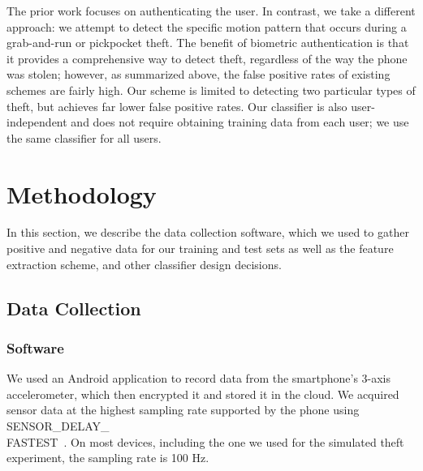 The prior work focuses on authenticating the user.
In contrast, we take a different approach: we attempt to detect the
specific motion pattern that occurs during a grab-and-run or pickpocket theft.
The benefit of biometric authentication is that it provides a comprehensive
way to detect theft, regardless of the way the phone was stolen; however,
as summarized above, the false positive rates of existing schemes
are fairly high.
Our scheme is limited to detecting two particular types of theft, but achieves
far lower false positive rates.
Our classifier is also user-independent and does not require obtaining
training data from each user; we use the same classifier for all users.




\section{Methodology}

In this section, we describe the data collection software, which we used to gather positive and negative data for our training and test sets as well as the feature extraction scheme, and other classifier design decisions.

\subsection{Data Collection}

\subsubsection{Software}
We used an Android application to record data from the smartphone's 3-axis accelerometer, which then encrypted it and stored it in the cloud.
We acquired sensor data at the highest sampling rate supported by the phone using SENSOR\_DELAY\_\\FASTEST~\cite{android:doc}.
On most devices, including the one we used for the simulated theft experiment, the sampling rate is 100 Hz.

